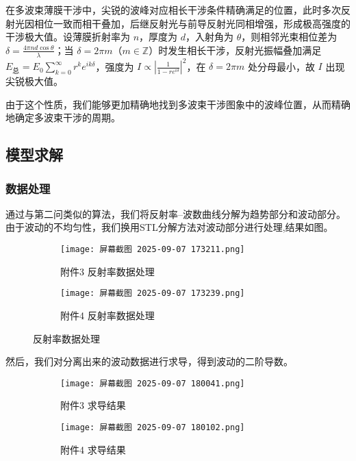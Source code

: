 \documentclass[withoutpreface,bwprint]{cumcmthesis}
\begin{document}
在多波束薄膜干涉中，尖锐的波峰对应相长干涉条件精确满足的位置，此时多次反射光因相位一致而相干叠加，后继反射光与前导反射光同相增强，形成极高强度的干涉极大值。设薄膜折射率为 $n$，厚度为 $d$，入射角为 $\theta$，则相邻光束相位差为 $\delta = \frac{4\pi n d \cos\theta}{\lambda}$；当 $\delta = 2\pi m$（$m \in \mathbb{Z}$）时发生相长干涉，反射光振幅叠加满足 $E_{\text{总}} = E_0 \sum_{k=0}^{\infty} r^k e^{i k \delta}$，强度为 $I \propto \left| \frac{1}{1 - r e^{i\delta}} \right|^2$，在 $\delta = 2\pi m$ 处分母最小，故 $I$ 出现尖锐极大值。

由于这个性质，我们能够更加精确地找到多波束干涉图象中的波峰位置，从而精确地确定多波束干涉的周期。

\subsection{模型求解}
\subsubsection{数据处理}
通过与第二问类似的算法，我们将反射率–波数曲线分解为趋势部分和波动部分。由于波动的不均匀性，我们换用STL分解方法对波动部分进行处理,结果如图。
\begin{figure}[H]
  \centering
  \begin{subfigure}[b]{0.49\linewidth}
    \texttt{[image: 屏幕截图 2025-09-07 173211.png]}

    \caption{附件3 反射率数据处理}
    \label{fig:附件3 反射率数据}
  \end{subfigure}
  \hfill
  \begin{subfigure}[b]{0.49\linewidth}
    \texttt{[image: 屏幕截图 2025-09-07 173239.png]}
    \caption{附件4 反射率数据处理}
    \label{fig:maosniow}
  \end{subfigure}
  \caption{反射率数据处理}
  \label{fig:double4}
\end{figure}
然后，我们对分离出来的波动数据进行求导，得到波动的二阶导数。
\begin{figure}[H]
  \centering
  \begin{subfigure}[b]{0.8\linewidth}
    \texttt{[image: 屏幕截图 2025-09-07 180041.png]}
    \caption{附件3 求导结果}
    \label{fig:附件3 求导结果}
  \end{subfigure}
  \hfill
  \begin{subfigure}[b]{0.8\linewidth}
    \texttt{[image: 屏幕截图 2025-09-07 180102.png]}
    \caption{附件4 求导结果}

    \label{fig:maosgniow}
  \end{subfigure}
  \caption{}
  \label{fig:double5}
\end{figure}
\end{document}
